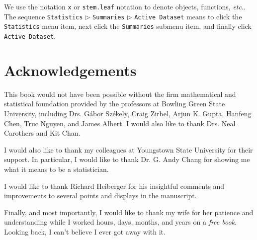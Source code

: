 We use the notation \texttt{x} or \texttt{stem.leaf} notation to denote objects, functions, \emph{etc}.. The sequence \texttt{Statistics} \(\triangleright\) \texttt{Summaries} \(\triangleright\) \texttt{Active Dataset} means to click the \texttt{Statistics} menu item, next click the \texttt{Summaries} submenu item, and finally click \texttt{Active Dataset}.

\section*{Acknowledgements}

This book would not have been possible without the firm mathematical and statistical foundation provided by the professors at Bowling Green State University, including Drs. G\'{a}{}bor Sz\'{e}{}kely, Craig Zirbel, Arjun K. Gupta, Hanfeng Chen, Truc Nguyen, and James Albert. I would also like to thank Drs. Neal Carothers and Kit Chan. 

I would also like to thank my colleagues at Youngstown State University for their support. In particular, I would like to thank Dr. G. Andy Chang for showing me what it means to be a statistician.

I would like to thank Richard Heiberger for his insightful comments and improvements to several points and displays in the manuscript. 

Finally, and most importantly, I would like to thank my wife for her patience and understanding while I worked hours, days, months, and years on a \emph{free book}. Looking back, I can't believe I ever got away with it.

\vfill{}
\cleardoublepage
{}
{}
\listoffigures

\vfill{}
\cleardoublepage
{}
{}
\listoftables

